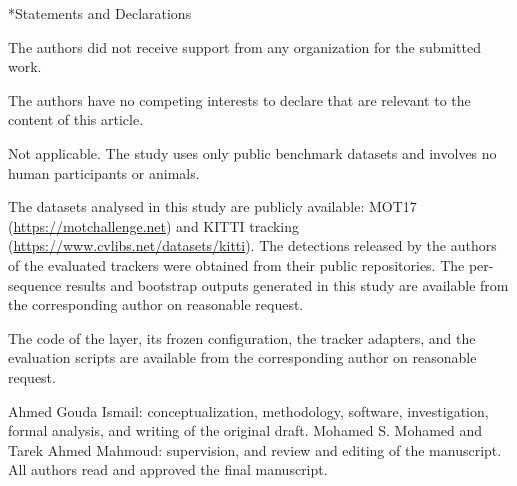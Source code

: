 \documentclass[pdflatex,sn-mathphys-num,iicol]{sn-jnl}
\makeatletter
\def\sectionfont{\reset@font\fontfamily{\rmdefault}\fontsize{11bp}{13bp}\bfseries\selectfont\raggedright\boldmath}
\renewcommand\section{\@startsection{section}{1}{\z@}{-8pt \@plus -2pt \@minus -2pt}{4pt}{\sectionfont}}
\makeatother
\begin{document}
\maketitle











\backmatter

\section*{Statements and Declarations}

The authors did not receive support from any organization for the submitted work.

The authors have no competing interests to declare that are relevant to the content of this
article.

Not applicable. The study uses only public benchmark datasets and involves no human participants
or animals.

The datasets analysed in this study are publicly available: MOT17
(\url{https://motchallenge.net}) and KITTI tracking (\url{https://www.cvlibs.net/datasets/kitti}).
The detections released by the authors of the evaluated trackers were obtained from their public
repositories. The per-sequence results and bootstrap outputs generated in this study are available
from the corresponding author on reasonable request.

The code of the layer, its frozen configuration, the tracker adapters, and the evaluation scripts
are available from the corresponding author on reasonable request.

Ahmed Gouda Ismail: conceptualization, methodology, software, investigation, formal analysis, and
writing of the original draft. Mohamed S. Mohamed and Tarek Ahmed Mahmoud: supervision, and
review and editing of the manuscript. All authors read and approved the final manuscript.


\end{document}
